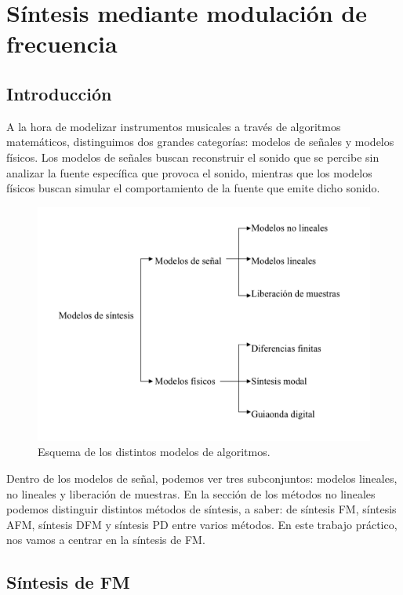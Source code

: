 \documentclass[../ASSD_TP2.tex]{subfiles}
\begin{document}
\section{Síntesis mediante modulación de frecuencia}

\subsection{Introducción}

A la hora de modelizar instrumentos musicales a través de algoritmos
matemáticos, distinguimos dos grandes categorías: modelos de señales
y modelos físicos. Los modelos de señales buscan reconstruir el sonido
que se percibe sin analizar la fuente específica que provoca el sonido,
mientras que los modelos físicos buscan simular el comportamiento
de la fuente que emite dicho sonido. 

\begin{figure}[H]
\centering{}\includegraphics[scale=0.5]{imagenes/esquema}\caption{Esquema de los distintos modelos de algoritmos.}
\end{figure}

Dentro de los modelos de señal, podemos ver tres subconjuntos: modelos
lineales, no lineales y liberación de muestras. En la sección de los
métodos no lineales podemos distinguir distintos métodos de síntesis,
a saber: de síntesis FM, síntesis AFM, síntesis DFM y síntesis PD
entre varios métodos. En este trabajo práctico, nos vamos a centrar
en la síntesis de FM.

\subsection{Síntesis de FM}
\end{document}
